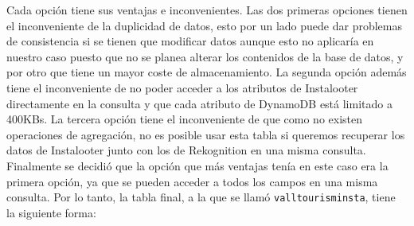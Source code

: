 Cada opción tiene sus ventajas e inconvenientes. Las dos primeras opciones tienen el inconveniente de la duplicidad de datos, esto por un lado puede dar problemas de consistencia si se tienen que modificar datos aunque esto no aplicaría en nuestro caso puesto que no se planea alterar los contenidos de la base de datos, y por otro que tiene un mayor coste de almacenamiento. La segunda opción además tiene el inconveniente de no poder acceder a los atributos de Instalooter directamente en la consulta y que cada atributo de DynamoDB está limitado a 400KBs. La tercera opción tiene el inconveniente de que como no existen operaciones de agregación, no es posible usar esta tabla si queremos recuperar los datos de Instalooter junto con los de Rekognition en una misma consulta. Finalmente se decidió que la opción que más ventajas tenía en este caso era la primera opción, ya que se pueden acceder a todos los campos en una misma consulta. Por lo tanto, la tabla final, a la que se llamó \texttt{valltourisminsta}, tiene la siguiente forma:

